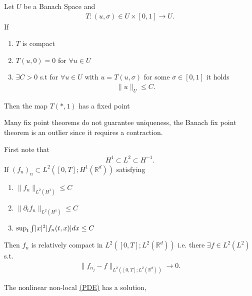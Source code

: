    \begin{theorem}\label{schauder_fixpoint}
     Let $U$ be a Banach Space and 
     \begin{align*}
      T: (u,\sigma ) \in  U \times  [0,1] \to U
     .\end{align*}
     If 
     \begin{enumerate}
      \item $T$ is compact 
      \item $T(u,0) = 0$ for $\forall  u \in  U$
      \item  $\exists  C >0$ s.t for $\forall  u \in  U$ with $u=T(u,\sigma )$ for some $\sigma  \in  [0,1]$ it holds 
        \begin{align*}
          \|u\|_{U} \le C
        .\end{align*}
     \end{enumerate}
     Then the map $T(*,1)$ has a fixed point
   \end{theorem}
   \begin{remark}
   Many fix point theorems do not guarantee uniqueness, the Banach fix point theorem is an outlier since it requires a contraction.
   \end{remark}
   \begin{lemma}\label{aubin}
    First note that
   \begin{align*}
    H^{1} \subset  L^{2}   \subset  H^{-1} 
   .\end{align*} 
   If  $(f_n)_n \subset  L^{2}([0,T];H^{1}(\mathbb{R}^{d} ) ) $ satisfying 
   \begin{enumerate}
     \item  $\|f_n\|_{L^{2}(H^{1} ) }\le C$ 
     \item $\|\partial_t f_n\|_{L^{2}(H^{1} ) }\le C$
     \item $\sup_t \int  \lvert x\rvert^2 \lvert f_n(t,x)\rvert dx \le C$
   \end{enumerate}
   Then $f_n$ is relatively compact in $L^{2}([0,T];L^{2}(\mathbb{R}^{d} ) ) $ i.e. there $\exists  f \in  L^{2}(L^{2} ) $ s.t.
   \begin{align*}
     \|f_{n_j} - f\|_{L^{2}([0,T];L^{2}(\mathbb{R}^{d} ) ) } \to 0
   .\end{align*}
   \end{lemma}
   \newpage
   \begin{theorem}
    The nonlinear non-local \hyperref[pde_mve_apprach]{(PDE)} has a solution,
   \end{theorem}

